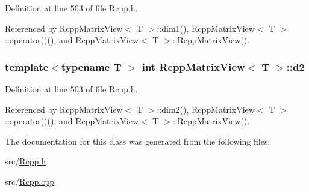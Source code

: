 Definition at line 503 of file Rcpp.h.

Referenced by RcppMatrixView$<$ T $>$::dim1(), RcppMatrixView$<$ T $>$::operator()(), and RcppMatrixView$<$ T $>$::RcppMatrixView().\hypertarget{classRcppMatrixView_37b5f5806957eeb0b688d6a157a2a264}{
\subsubsection[{d2}]{\setlength{\rightskip}{0pt plus 5cm}template$<$typename T $>$ int {\bf RcppMatrixView}$<$ T $>$::{\bf d2}}}
\label{classRcppMatrixView_37b5f5806957eeb0b688d6a157a2a264}




Definition at line 503 of file Rcpp.h.

Referenced by RcppMatrixView$<$ T $>$::dim2(), RcppMatrixView$<$ T $>$::operator()(), and RcppMatrixView$<$ T $>$::RcppMatrixView().

The documentation for this class was generated from the following files:\begin{CompactItemize}
\item 
src/\hyperlink{Rcpp_8h}{Rcpp.h}\item 
src/\hyperlink{Rcpp_8cpp}{Rcpp.cpp}\end{CompactItemize}
